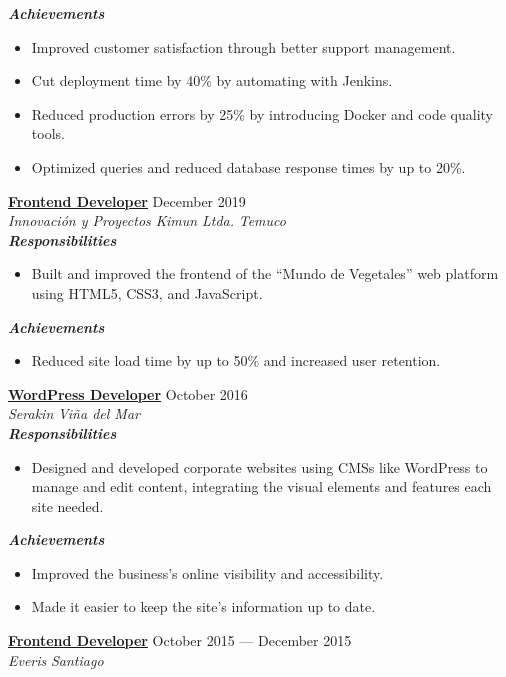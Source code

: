 \documentclass[11pt,a4paper]{article}
\newcommand{\job}[4]{%
    \textbf{\underline{#1}} \hfill #2\\
    \textit{#3} \hfill \textit{#4}\\[2pt]
}
\newcommand{\newsubsection}[1]{
    \vspace{0em}
    \textbf{\textit{#1}}
    \vspace{0em}
}
\begin{document}
\newsubsection{Achievements}
\begin{itemize}[leftmargin=*, noitemsep, topsep=2pt]
    \item Improved customer satisfaction through better support management.
    \item Cut deployment time by 40\% by automating with Jenkins.
    \item Reduced production errors by 25\% by introducing Docker and code quality tools.
    \item Optimized queries and reduced database response times by up to 20\%.
\end{itemize}

\job{Frontend Developer}{December 2019}{Innovación y Proyectos Kimun Ltda.}{Temuco}

\newsubsection{Responsibilities}
\begin{itemize}[leftmargin=*, noitemsep, topsep=2pt]
    \item Built and improved the frontend of the ``Mundo de Vegetales'' web platform using HTML5, CSS3, and JavaScript.
\end{itemize}

\newsubsection{Achievements}
\begin{itemize}[leftmargin=*, noitemsep, topsep=2pt]
    \item Reduced site load time by up to 50\% and increased user retention.
\end{itemize}

\job{WordPress Developer}{October 2016}{Serakin}{Viña del Mar}

\newsubsection{Responsibilities}
\begin{itemize}[leftmargin=*, noitemsep, topsep=2pt]
    \item Designed and developed corporate websites using CMSs like WordPress to manage and edit content, integrating the visual elements and features each site needed.
\end{itemize}

\newsubsection{Achievements}
\begin{itemize}[leftmargin=*, noitemsep, topsep=2pt]
    \item Improved the business's online visibility and accessibility.
    \item Made it easier to keep the site's information up to date.
\end{itemize}

\job{Frontend Developer}{October 2015 --- December 2015}{Everis}{Santiago}
\end{document}
